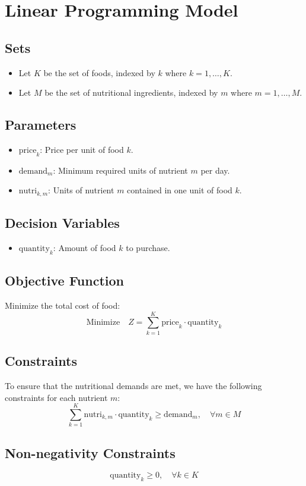 \documentclass{article}
\begin{document}
\section*{Linear Programming Model}

\subsection*{Sets}
\begin{itemize}
    \item Let \( K \) be the set of foods, indexed by \( k \) where \( k = 1, \ldots, K \).
    \item Let \( M \) be the set of nutritional ingredients, indexed by \( m \) where \( m = 1, \ldots, M \).
\end{itemize}

\subsection*{Parameters}
\begin{itemize}
    \item \( \text{price}_{k} \): Price per unit of food \( k \).
    \item \( \text{demand}_{m} \): Minimum required units of nutrient \( m \) per day.
    \item \( \text{nutri}_{k, m} \): Units of nutrient \( m \) contained in one unit of food \( k \).
\end{itemize}

\subsection*{Decision Variables}
\begin{itemize}
    \item \( \text{quantity}_{k} \): Amount of food \( k \) to purchase.
\end{itemize}

\subsection*{Objective Function}
Minimize the total cost of food:
\[
\text{Minimize} \quad Z = \sum_{k=1}^{K} \text{price}_{k} \cdot \text{quantity}_{k}
\]

\subsection*{Constraints}
To ensure that the nutritional demands are met, we have the following constraints for each nutrient \( m \):
\[
\sum_{k=1}^{K} \text{nutri}_{k, m} \cdot \text{quantity}_{k} \geq \text{demand}_{m}, \quad \forall m \in M
\]

\subsection*{Non-negativity Constraints}
\[
\text{quantity}_{k} \geq 0, \quad \forall k \in K
\]
\end{document}
